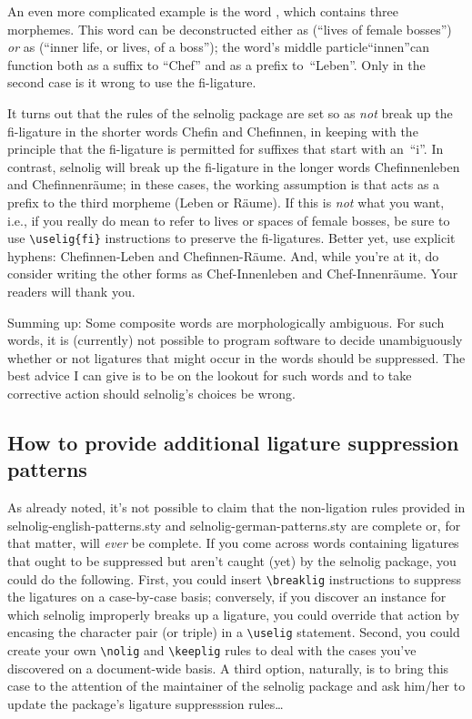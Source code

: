 \documentclass[11pt]{article}
\newcommand{\pkg}[1]{\textsf{#1}}
\newcommand{\opt}[1]{\uselig{\texttt{#1}}}
\newcommand{\cmmd}[1]{\texttt{\textbackslash #1}}
\begin{document}
An even more complicated example is the word \opt{Chefinnenleben}, which contains three morphemes. This word can be deconstructed either as \opt{Chefinnen-leben} (\enquote{lives of female bosses}) \emph{or} as \opt{Chef-innenleben} (\enquote{inner life, or lives, of a boss}); the word's middle particle\textemdash\enquote{innen}\textemdash can function both as a suffix to \enquote{Chef} and as a prefix to~\enquote{Leben}. Only in the second case is it wrong to use the fi-ligature. 

It turns out that the rules of the \pkg{selnolig} package are set so as \emph{not} break up the fi-ligature in the shorter words Chefin and Chefinnen, in keeping with the principle that the fi-ligature is permitted for suffixes that start with an~\enquote{i}. In contrast, \pkg{selnolig} will break up the fi-ligature in the longer words Chefinnenleben and Chefinnenräume; in these cases, the working assumption is that \opt{innen} acts as a prefix to the third morpheme (Leben or Räume). If this is \emph{not} what you want, i.e., if you really do mean to refer to lives or spaces of female bosses, be sure to use \Verb+\uselig{fi}+ instructions to preserve the fi-ligatures. Better yet, use explicit hyphens: Chefinnen-Leben and Chefinnen-Räume. And, while you're at it, do consider writing the other forms as Chef-Innenleben and Chef-Innenräume. Your readers will thank you.

\enlargethispage{0.8\baselineskip}

Summing up: Some composite words are morphologically ambiguous. For such words, it is (currently) not possible to program software to decide unambiguously whether or not ligatures that might occur in the words should be suppressed. The best advice I can give is to be on the lookout for such words and to take corrective action should \pkg{selnolig}'s choices be wrong.



\subsection{How to provide additional ligature suppression patterns}

As already noted, it's not possible to claim that the non-ligation rules provided in \pkg{selnolig-english-patterns.sty} and \pkg{selnolig-german-patterns.sty} are complete or, for that matter, will \emph{ever} be complete. If you come across words containing ligatures that ought to be suppressed but aren't caught (yet) by the \pkg{selnolig} package, you could do the following. First, you could insert \cmmd{breaklig} instructions to suppress the ligatures on a case-by-case basis; conversely, if you discover an instance for which \pkg{selnolig} improperly breaks up a ligature, you could override that action by encasing the character pair (or triple) in a \cmmd{uselig} statement. Second, you could create your own \cmmd{nolig} and \cmmd{keeplig} rules to deal with the cases you've discovered on a document-wide basis. A third option, naturally, is to bring this case to the attention of the maintainer of the \pkg{selnolig} package and ask him/her to update the package's ligature suppresssion rules\dots
\end{document}
